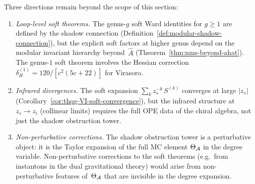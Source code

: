 \begin{remark}
\label{rem:thqg-VI-open-directions}
Three directions remain beyond the scope of this section:
\begin{enumerate}[label=\textup{(\roman*)}]
\item \emph{Loop-level soft theorems.} The genus-$g$ soft
 Ward identities for $g \geq 1$ are defined by the shadow
 connection (Definition~\ref{def:modular-shadow-connection}),
 but the explicit soft factors at higher genus depend on
 the modular invariant hierarchy
 beyond~$\hat{A}$ (Theorem~\ref{thm:nms-beyond-ahat}).
 The genus-$1$ soft theorem involves the Hessian correction
 $\delta_H^{(1)} = 120/[c^2(5c+22)]$ for Virasoro.
\item \emph{Infrared divergences.} The soft expansion
 $\sum_k z_s^{-k}\,S^{(k)}$ converges at large $|z_s|$
 (Corollary~\ref{cor:thqg-VI-soft-convergence}), but the
 infrared structure at $z_s \to z_i$ (collinear limits)
 requires the full OPE data of the chiral algebra, not
 just the shadow obstruction tower.
\item \emph{Non-perturbative corrections.} The shadow
 obstruction tower is a perturbative object: it is the
 Taylor expansion of the full MC element
 $\Theta_{\mathcal{A}}$ in the degree variable. Non-perturbative
 corrections to the soft theorems (e.g.\ from instantons in
 the dual gravitational theory) would arise from
 non-perturbative features of~$\Theta_{\mathcal{A}}$ that are invisible
 in the degree expansion.
\end{enumerate}
\end{remark}

